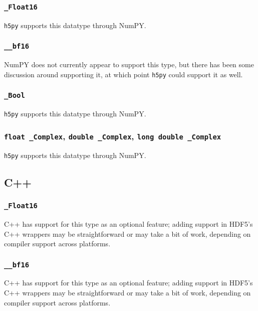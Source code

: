 \documentclass[../HDF5_RFC.tex]{subfiles}
\begin{document}
\subsubsection{\texttt{\_Float16}}

\texttt{h5py} supports this datatype through NumPY.

\subsubsection{\texttt{\_\_bf16}}

NumPY does not currently appear to support this type, but there has been some discussion around
supporting it, at which point \texttt{h5py} could support it as well.

\subsubsection{\texttt{\_Bool}}

\texttt{h5py} supports this datatype through NumPY.

\subsubsection{\texttt{float \_Complex}, \texttt{double \_Complex}, \texttt{long double \_Complex}}

\texttt{h5py} supports this datatype through NumPY.

\subsection{C++}

\subsubsection{\texttt{\_Float16}}

C++ has support for this type as an optional feature; adding support in HDF5's C++ wrappers may be
straightforward or may take a bit of work, depending on compiler support across platforms.

\subsubsection{\texttt{\_\_bf16}}

C++ has support for this type as an optional feature; adding support in HDF5's C++ wrappers may be
straightforward or may take a bit of work, depending on compiler support across platforms.
\end{document}
